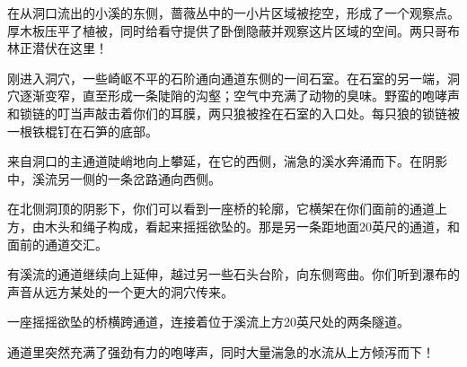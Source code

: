 \documentclass[letterpaper,twocolumn,openany,nodeprecatedcode]{dndbook}
\begin{document}
\begin{DndReadAloud}
  \begin{chinese}
    在从洞口流出的小溪的东侧，蔷薇丛中的一小片区域被挖空，形成了一个观察点。厚木板压平了植被，同时给看守提供了卧倒隐蔽并观察这片区域的空间。两只哥布林正潜伏在这里！
  \end{chinese}
\end{DndReadAloud}

\begin{DndReadAloud}
  \begin{chinese}
    刚进入洞穴，一些崎岖不平的石阶通向通道东侧的一间石室。在石室的另一端，洞穴逐渐变窄，直至形成一条陡陗的沟壑；空气中充满了动物的臭味。野蛮的咆哮声和锁链的叮当声敲击着你们的耳膜，两只狼被拴在石室的入口处。每只狼的锁链被一根铁棍钉在石笋的底部。
  \end{chinese}
\end{DndReadAloud}

\begin{DndReadAloud}
  \begin{chinese}
    来自洞口的主通道陡峭地向上攀延，在它的西侧，湍急的溪水奔涌而下。在阴影中，溪流另一侧的一条岔路通向西侧。
  \end{chinese}
\end{DndReadAloud}

\begin{DndReadAloud}
  \begin{chinese}
    在北侧洞顶的阴影下，你们可以看到一座桥的轮廓，它横架在你们面前的通道上方，由木头和绳子构成，看起来摇摇欲坠的。那是另一条距地面20英尺的通道，和面前的通道交汇。
  \end{chinese}
\end{DndReadAloud}

\begin{DndReadAloud}
  \begin{chinese}
    有溪流的通道继续向上延伸，越过另一些石头台阶，向东侧弯曲。你们听到瀑布的声音从远方某处的一个更大的洞穴传来。
  \end{chinese}
\end{DndReadAloud}

\begin{DndReadAloud}
  \begin{chinese}
    一座摇摇欲坠的桥横跨通道，连接着位于溪流上方20英尺处的两条隧道。
  \end{chinese}
\end{DndReadAloud}

\begin{DndReadAloud}
  \begin{chinese}
    通道里突然充满了强劲有力的咆哮声，同时大量湍急的水流从上方倾泻而下！
  \end{chinese}
\end{DndReadAloud}
\end{document}
